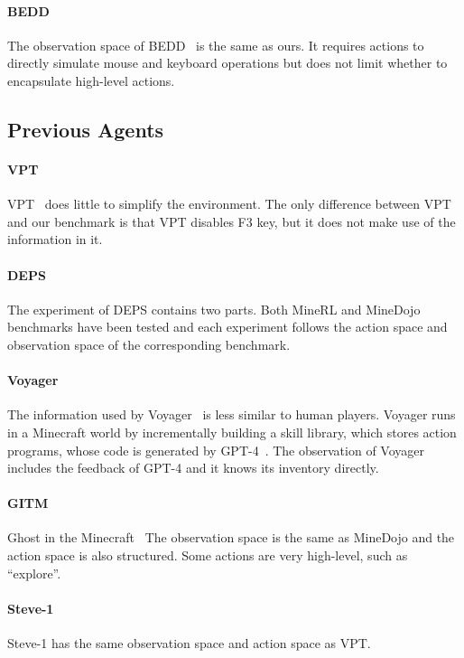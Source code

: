 \paragraph{BEDD} The observation space of BEDD~\citep{milani2023bedd} is the same as ours. It requires actions to directly simulate mouse and keyboard operations but does not limit whether to encapsulate high-level actions. 


\subsection{Previous Agents}

\paragraph{VPT} VPT~\citep{vpt} does little to simplify the environment. The only difference between VPT and our benchmark is that VPT disables F3 key, but it does not make use of the information in it.

\paragraph{DEPS} The experiment of DEPS contains two parts. Both MineRL and MineDojo benchmarks have been tested and each experiment follows the action space and observation space of the corresponding benchmark.

\paragraph{Voyager} The information used by Voyager~\citep{voyager} is less similar to human players. Voyager runs in a Minecraft world by incrementally building a skill library, which stores action programs, whose code is generated by GPT-4~\citep{gpt4}. The observation of Voyager includes the feedback of GPT-4 and it knows its inventory directly.

\paragraph{GITM} Ghost in the Minecraft~\citet{gitm} The observation space is the same as MineDojo and the action space is also structured. Some actions are very high-level, such as ``explore''.

\paragraph{Steve-1} Steve-1 has the same observation space and action space as VPT.

